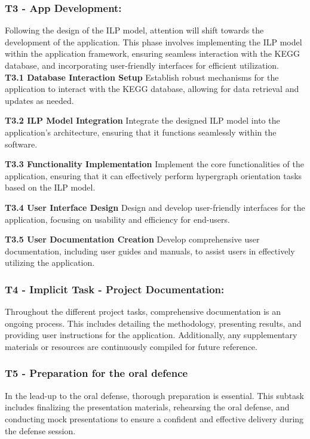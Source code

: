     \subsubsection{T3 - App Development:}
        Following the design of the ILP model, attention will shift towards the development of the application. This phase involves implementing the ILP model within the application framework, ensuring seamless interaction with the KEGG database, and incorporating user-friendly interfaces for efficient utilization.\\

        \textbf{T3.1 Database Interaction Setup}
        Establish robust mechanisms for the application to interact with the KEGG database, allowing for data retrieval and updates as needed.
        
        \textbf{T3.2 ILP Model Integration}
        Integrate the designed ILP model into the application's architecture, ensuring that it functions seamlessly within the software.
        
        \textbf{T3.3 Functionality Implementation}
        Implement the core functionalities of the application, ensuring that it can effectively perform hypergraph orientation tasks based on the ILP model.
        
        \textbf{T3.4 User Interface Design}
        Design and develop user-friendly interfaces for the application, focusing on usability and efficiency for end-users.
        
        \textbf{T3.5 User Documentation Creation}
        Develop comprehensive user documentation, including user guides and manuals, to assist users in effectively utilizing the application.

    \subsubsection{T4 - Implicit Task - Project Documentation:}
        Throughout the different project tasks, comprehensive documentation is an ongoing process. This includes detailing the methodology, presenting results, and providing user instructions for the application. Additionally, any supplementary materials or resources are continuously compiled for future reference.
    \subsubsection{T5 - Preparation for the oral defence}
        In the lead-up to the oral defense, thorough preparation is essential. This subtask includes finalizing the presentation materials, rehearsing the oral defense, and conducting mock presentations to ensure a confident and effective delivery during the defense session.

